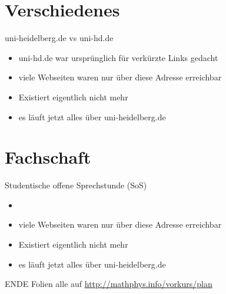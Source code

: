 \section{Verschiedenes}
\begin{frame}{uni-heidelberg.de vs uni-hd.de}
    \begin{itemize}
        \item uni-hd.de war ursprünglich für verkürzte Links gedacht
        \item viele Webseiten waren nur über diese Adresse erreichbar
        \item Existiert eigentlich nicht mehr
        \item es läuft jetzt alles über uni-heidelberg.de
    \end{itemize}
\end{frame}

\section{Fachschaft}
\begin{frame}{Studentische offene Sprechstunde (SoS)}
    \begin{itemize}
        \item 
        \item viele Webseiten waren nur über diese Adresse erreichbar
        \item Existiert eigentlich nicht mehr
        \item es läuft jetzt alles über uni-heidelberg.de
    \end{itemize}
\end{frame}

\begin{frame}{ENDE}
    \center
    Folien alle auf \url{http://mathphys.info/vorkurs/plan}
\end{frame}

